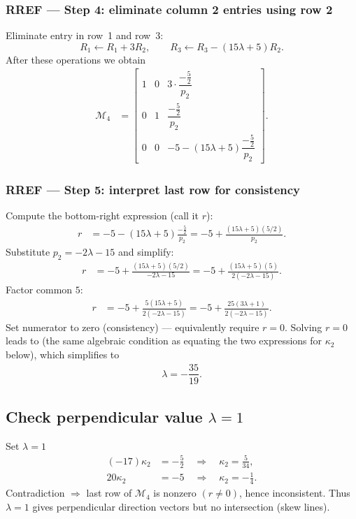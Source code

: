 \documentclass[journal]{IEEEtran}
\begin{document}
\subsubsection*{RREF — Step 4: eliminate column 2 entries using row 2}
Eliminate entry in row~1 and row~3:
\[
R_1 \leftarrow R_1 + 3R_2,\qquad 
R_3 \leftarrow R_3 - (15\lambda+5)R_2.
\]
After these operations we obtain
\begin{align}
\mathcal{M}_4 &=
\left[\begin{array}{cc|c}
1 & 0 & 3\cdot \dfrac{-\tfrac{5}{2}}{p_2} \\[6pt]
0 & 1 & \dfrac{-\tfrac{5}{2}}{p_2} \\[6pt]
0 & 0 & -5 - (15\lambda+5)\dfrac{-\tfrac{5}{2}}{p_2}
\end{array}\right]. \label{M4}
\end{align}

\subsubsection*{RREF — Step 5: interpret last row for consistency}
Compute the bottom-right expression (call it \(r\)):
\begin{align}
r &= -5 - (15\lambda+5)\frac{-\tfrac{5}{2}}{p_2}
= -5 + \frac{(15\lambda+5)(5/2)}{p_2}.
\end{align}
Substitute \(p_2=-2\lambda-15\) and simplify:
\begin{align}
r &= -5 + \frac{(15\lambda+5)(5/2)}{-2\lambda-15}
= -5 + \frac{(15\lambda+5)(5)}{2(-2\lambda-15)}.
\end{align}
Factor common \(5\):
\begin{align}
r &= -5 + \frac{5(15\lambda+5)}{2(-2\lambda-15)}
= -5 + \frac{25(3\lambda+1)}{2(-2\lambda-15)}.
\end{align}
Set numerator to zero (consistency) — equivalently require \(r=0\). Solving \(r=0\) leads to
(the same algebraic condition as equating the two expressions for \(\kappa_2\) below),
which simplifies to
\begin{align}
\boxed{\lambda = -\dfrac{35}{19}}.
\end{align}

\subsection*{Check perpendicular value \(\lambda=1\)}
Set \(\lambda=1\) \begin{align}
(-17)\kappa_2 &= -\tfrac{5}{2} \quad\Rightarrow\quad \kappa_2=\tfrac{5}{34},\\
20\kappa_2 &= -5 \quad\Rightarrow\quad \kappa_2=-\tfrac{1}{4}.
\end{align}
Contradiction \(\Rightarrow\) last row of \(\mathcal{M}_4\) is nonzero \( (r\neq0) \), hence inconsistent. Thus \(\lambda=1\) gives perpendicular direction vectors but no intersection (skew lines).
\end{document}
